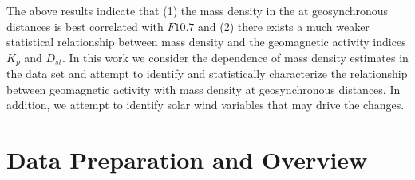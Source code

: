 \documentclass[12pt]{article}
\begin{document}
The above results indicate that (1) the mass density in the at geosynchronous distances is best correlated with $F10.7$ and (2) there exists a much weaker statistical relationship between mass density and the geomagnetic activity indices $K_p$ and $D_{st}$.  In this work we consider the dependence of mass density estimates in the \cite{Takahashi2010} data set and attempt to identify and statistically characterize the relationship between geomagnetic activity with mass density at geosynchronous distances.  In addition, we attempt to identify solar wind variables that may drive the changes. 




\section{Data Preparation and Overview}
\end{document}
